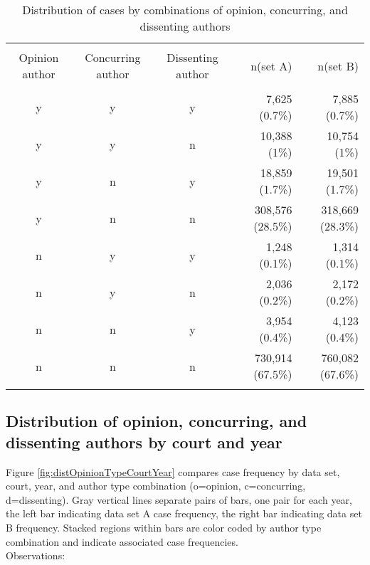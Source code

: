 \documentclass[10pt, letterpaper]{article}
\begin{document}
\begin{spacing}{1.0}
\begin{table}[H]
    \centering
    \caption{Distribution of cases by combinations of opinion, concurring, and dissenting authors}
    \begin{tabular}{cccrr}
        \hline\\[-6pt]
        Opinion author & Concurring author & Dissenting author & n(set A) & n(set B)\\[4pt]
        \hline\\[-6pt]
        y & y & y &   7,625 (0.7\%) &   7,885 (0.7\%)\\
        y & y & n &  10,388 (1\%) &  10,754 (1\%)\\
        y & n & y &  18,859 (1.7\%) &  19,501 (1.7\%)\\
        y & n & n & 308,576 (28.5\%) & 318,669 (28.3\%)\\
        n & y & y &   1,248 (0.1\%) &   1,314 (0.1\%)\\
        n & y & n &   2,036 (0.2\%) &   2,172 (0.2\%)\\
        n & n & y &   3,954 (0.4\%) &   4,123 (0.4\%)\\
        n & n & n & 730,914 (67.5\%) & 760,082 (67.6\%)\\[4pt]
        \hline\\
    \end{tabular}
    \label{tab:distOpinionType}
\end{table}


\clearpage

\subsection{Distribution of opinion, concurring, and dissenting authors by court and year}

Figure \ref{fig:distOpinionTypeCourtYear} compares case frequency by data set, court, year, and author type combination (o=opinion, c=concurring, d=dissenting).  Gray vertical lines separate pairs of bars, one pair for each year, the left bar indicating data set A case frequency, the right bar indicating data set B frequency.  Stacked regions within bars are color coded by author type combination and indicate associated case frequencies.\\

Observations:


\end{spacing}
\end{document}
